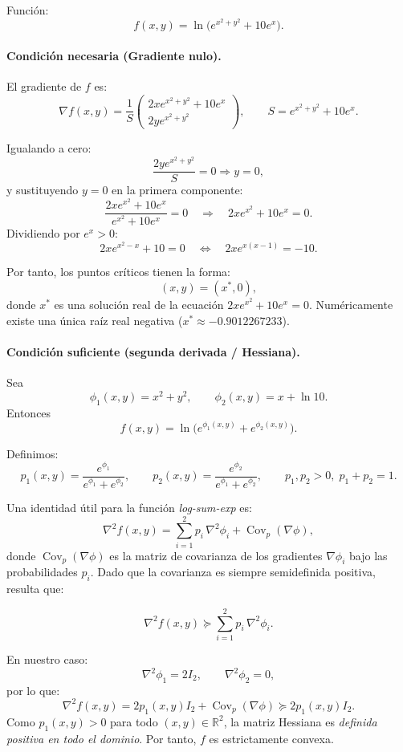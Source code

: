 \documentclass{article}
\begin{document}


Función:
\[
f(x,y)=\ln\!\big(e^{x^{2}+y^{2}}+10e^{x}\big).
\]

\paragraph{Condición necesaria (Gradiente nulo).}
El gradiente de $f$ es:
\[
\nabla f(x,y)
=
\frac{1}{S}
\begin{pmatrix}
2x e^{x^{2}+y^{2}} + 10e^{x}\\[6pt]
2y e^{x^{2}+y^{2}}
\end{pmatrix},
\qquad S = e^{x^{2}+y^{2}} + 10e^{x}.
\]

Igualando a cero:
\[
\frac{2y e^{x^{2}+y^{2}}}{S}=0 \Rightarrow y=0,
\]
y sustituyendo $y=0$ en la primera componente:
\[
\frac{2x e^{x^{2}} + 10 e^{x}}{e^{x^{2}} + 10 e^{x}} = 0
\quad\Longrightarrow\quad
2x e^{x^{2}} + 10 e^{x} = 0.
\]
Dividiendo por $e^{x}>0$:
\[
2x e^{x^{2}-x} + 10 = 0
\quad\Longleftrightarrow\quad
2x e^{x(x-1)} = -10.
\]

Por tanto, los puntos críticos tienen la forma:
\[
(x,y)=(x^{*},0),
\]
donde $x^{*}$ es una solución real de la ecuación
$2x e^{x^{2}} + 10 e^{x}=0$.
Numéricamente existe una única raíz real negativa
($x^{*}\approx -0.9012267233$).

\paragraph{Condición suficiente (segunda derivada / Hessiana).}
Sea
\[
\phi_1(x,y)=x^2+y^2, \qquad
\phi_2(x,y)=x+\ln 10.
\]
Entonces
\[
f(x,y)=\ln\big(e^{\phi_1(x,y)}+e^{\phi_2(x,y)}\big).
\]

Definimos:
\[
p_1(x,y)=\frac{e^{\phi_1}}{e^{\phi_1}+e^{\phi_2}}, \qquad
p_2(x,y)=\frac{e^{\phi_2}}{e^{\phi_1}+e^{\phi_2}},
\qquad p_1,p_2>0,\;p_1+p_2=1.
\]

Una identidad útil para la función \emph{log-sum-exp} es:
\[
\nabla^2 f(x,y)
= \sum_{i=1}^2 p_i\,\nabla^2 \phi_i
+ \operatorname{Cov}_p(\nabla \phi),
\]
donde $\operatorname{Cov}_p(\nabla \phi)$ es la matriz de covarianza
de los gradientes $\nabla \phi_i$ bajo las probabilidades $p_i$.
Dado que la covarianza es siempre semidefinida positiva, resulta que:

\[
\nabla^2 f(x,y) \succeq \sum_{i=1}^2 p_i\,\nabla^2 \phi_i.
\]

En nuestro caso:
\[
\nabla^2 \phi_1 = 2I_2, \qquad \nabla^2 \phi_2 = 0,
\]
por lo que:
\[
\nabla^2 f(x,y) = 2p_1(x,y)I_2 + \operatorname{Cov}_p(\nabla \phi)
\succeq 2p_1(x,y)I_2.
\]
Como $p_1(x,y)>0$ para todo $(x,y)\in\mathbb{R}^2$,
la matriz Hessiana es \emph{definida positiva en todo el dominio}.
Por tanto, $f$ es estrictamente convexa.
\end{document}
